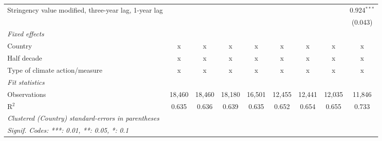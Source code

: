 \begin{table}[htbp]
\begin{tabular}{lcccccccc}
      Stringency value modified, three-year lag, 1-year lag                     &                &               &               &               &               &                &               & 0.924$^{***}$\\   
                                                                                &                &               &               &               &               &                &               & (0.043)\\   
      \emph{Fixed effects}\\
      Country                                                                   & x              & x             & x             & x             & x             & x              & x             & x\\  
      Half decade                                                               & x              & x             & x             & x             & x             & x              & x             & x\\  
      Type of climate action/measure                                            & x              & x             & x             & x             & x             & x              & x             & x\\  
      \midrule \emph{Fit statistics}\\
      Observations                                                              & 18,460         & 18,460        & 18,180        & 16,501        & 12,455        & 12,441         & 12,035        & 11,846\\  
      R$^2$                                                                     & 0.635          & 0.636         & 0.639         & 0.635         & 0.652         & 0.654          & 0.655         & 0.733\\  
      \midrule
      \multicolumn{9}{l}{\emph{Clustered (Country) standard-errors in parentheses}}\\
      \multicolumn{9}{l}{\emph{Signif. Codes: ***: 0.01, **: 0.05, *: 0.1}}\\
   \end{tabular}
\end{table}


